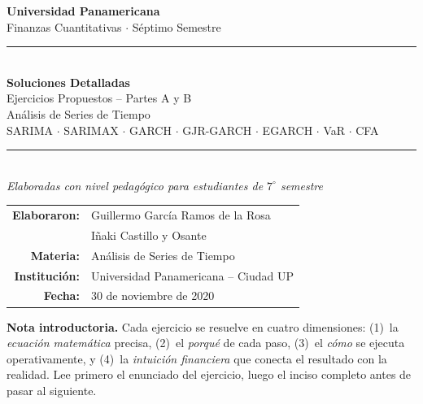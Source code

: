 \documentclass[11pt,a4paper]{article}
\begin{document}
\thispagestyle{empty}

\begin{center}
  \vspace*{1.5cm}
  {\LARGE\bfseries\color{azulUP} Universidad Panamericana}\\[6pt]
  {\large\color{moradoUP} Finanzas Cuantitativas $\cdot$ Séptimo Semestre}\\[10pt]
  \noindent\color{azulUP}\rule{\linewidth}{1.5pt}\\[8pt]
  {\Huge\bfseries\color{azulUP} Soluciones Detalladas}\\[6pt]
  {\large\color{moradoUP} Ejercicios Propuestos -- Partes A y B}\\[8pt]
  {\large Análisis de Series de Tiempo}\\[4pt]
  {\normalsize SARIMA $\cdot$ SARIMAX $\cdot$ GARCH $\cdot$ GJR-GARCH $\cdot$ EGARCH $\cdot$ VaR $\cdot$ CFA}\\[6pt]
  \noindent\color{azulUP}\rule{\linewidth}{1.5pt}\\[14pt]
  {\normalsize\itshape Elaboradas con nivel pedagógico para estudiantes de $7^\circ$ semestre}\\[12pt]
  \begin{tabular}{rl}
    \textbf{Elaboraron:} & Guillermo García Ramos de la Rosa \\
                         & Iñaki Castillo y Osante \\
    \textbf{Materia:}    & Análisis de Series de Tiempo \\
    \textbf{Institución:} & Universidad Panamericana -- Ciudad UP \\
    \textbf{Fecha:}      & 30 de noviembre de 2020 \\
  \end{tabular}
\end{center}

\vspace{14pt}
{\small
\textbf{Nota introductoria.} Cada ejercicio se resuelve en cuatro dimensiones:
(1)~la \emph{ecuación matemática} precisa,
(2)~el \emph{porqué} de cada paso,
(3)~el \emph{cómo} se ejecuta operativamente, y
(4)~la \emph{intuición financiera} que conecta el resultado con la realidad.
Lee primero el enunciado del ejercicio, luego el inciso completo antes de pasar al siguiente.
}

\newpage
\tableofcontents
\newpage

\end{document}
